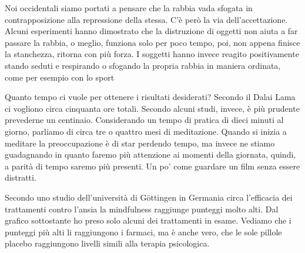 \documentclass[12pt]{book} %
\begin{document}
Noi occidentali siamo portati a pensare che la rabbia vada sfogata in contrapposizione alla repressione della stessa.
C'è però la via dell'accettazione. Alcuni esperimenti hanno dimostrato che la
distruzione di oggetti non aiuta a far passare la rabbia, o meglio, funziona solo per poco tempo, poi, non appena finisce la stanchezza, ritorna con più forza. I soggetti hanno invece reagito positivamente stando seduti e respirando o sfogando la propria rabbia in maniera
ordinata, come per esempio con lo sport

Quanto tempo ci vuole per ottenere i risultati desiderati? Secondo il Dalai Lama ci vogliono circa
cinquanta ore totali. Secondo alcuni studi, invece, è più prudente prevederne un centinaio. Considerando un
tempo di pratica di dieci minuti al giorno, parliamo di circa tre o quattro mesi di meditazione.
Quando si inizia a meditare la preoccupazione è di star perdendo tempo, ma invece ne stiamo guadagnando in quanto faremo più attenzione ai momenti della giornata, quindi, a parità di tempo saremo più presenti. Un po' come guardare un film senza essere distratti.

Secondo uno studio dell'università di Göttingen in Germania circa l'efficacia
dei trattamenti contro
l'ansia la mindfulness raggiunge punteggi molto alti. Dal grafico sottostante ho preso solo alcuni dei trattamenti in esame.
Vediamo che i punteggi più alti li raggiungono i farmaci, ma è anche vero, che le sole pillole placebo raggiungono
livelli simili alla terapia psicologica.

\needspace{4cm}
\begin{figure}[H]
  \centering
\end{figure}
\end{document}
